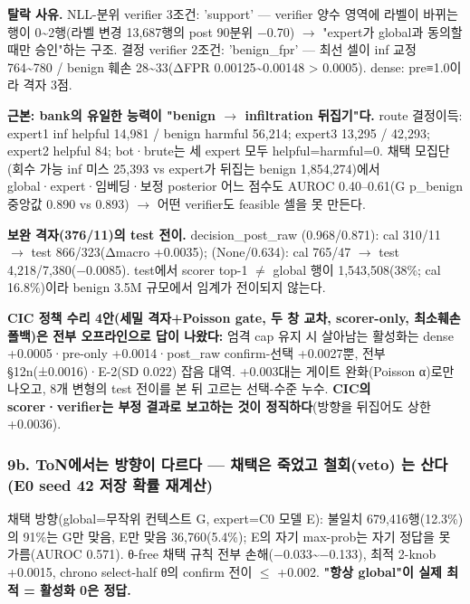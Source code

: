 \par\noindent \textbullet\enspace \textbf{탈락 사유.} NLL-분위 verifier 3조건: 'support' — verifier 양수 영역에 라벨이 바뀌는 행이 0\textasciitilde{}2행(라벨 변경 13,687행의 post 90분위 −0.70)  \ensuremath{\rightarrow}  "expert가 global과 동의할 때만 승인"하는 구조. 결정 verifier 2조건: 'benign\_\allowbreak{}fpr' — 최선 셀이 inf 교정 764\textasciitilde{}780 /\allowbreak{} benign 훼손 28\textasciitilde{}33(ΔFPR 0.00125\textasciitilde{}0.00148 > 0.0005). dense: pre≡1.0이라 격자 3점.


\par\noindent \textbullet\enspace \textbf{근본: bank의 유일한 능력이 "benign \ensuremath{\rightarrow} infiltration 뒤집기"다.} route 결정이득: expert1 inf helpful 14,981 /\allowbreak{} benign harmful 56,214; expert3 13,295 /\allowbreak{} 42,293; expert2 helpful 84; bot·brute는 세 expert 모두 helpful=\allowbreak{}harmful=\allowbreak{}0. 채택 모집단(회수 가능 inf 미스 25,393 vs expert가 뒤집는 benign 1,854,274)에서 global·expert·임베딩·보정 posterior 어느 점수도 AUROC 0.40–0.61(G p\_\allowbreak{}benign 중앙값 0.890 vs 0.893)  \ensuremath{\rightarrow}  어떤 verifier도 feasible 셀을 못 만든다.


\par\noindent \textbullet\enspace \textbf{보완 격자(376/\allowbreak{}11)의 test 전이.} decision\_\allowbreak{}post\_\allowbreak{}raw (0.968/\allowbreak{}0.871): cal 310/\allowbreak{}11  \ensuremath{\rightarrow}  test 866/\allowbreak{}323(Δmacro +\allowbreak{}0.0035); (None/\allowbreak{}0.634): cal 765/\allowbreak{}47  \ensuremath{\rightarrow}  test 4,218/\allowbreak{}7,380(−0.0085). test에서 scorer top-1 \ensuremath{\neq} global 행이 1,543,508(38\%; cal 16.8\%)이라 benign 3.5M 규모에서 임계가 전이되지 않는다.


\par\noindent \textbullet\enspace \textbf{CIC 정책 수리 4안(세밀 격자+\allowbreak{}Poisson gate, 두 창 교차, scorer-only, 최소훼손 폴백)은 전부 오프라인으로 답이 나왔다:} 엄격 cap 유지 시 살아남는 활성화는 dense +\allowbreak{}0.0005·pre-only +\allowbreak{}0.0014·post\_\allowbreak{}raw confirm-선택 +\allowbreak{}0.0027뿐, 전부 §12n(±0.0016)·E-2(SD 0.022) 잡음 대역. +\allowbreak{}0.003대는 게이트 완화(Poisson α)로만 나오고, 8개 변형의 test 전이를 본 뒤 고르는 선택-수준 누수. \textbf{CIC의 scorer·verifier는 부정 결과로 보고하는 것이 정직하다}(방향을 뒤집어도 상한 +\allowbreak{}0.0036).


\subsubsection{9b. ToN에서는 방향이 다르다 — 채택은 죽었고 \textbf{철회(veto)} 는 산다 (E0 seed 42 저장 확률 재계산)}
\par\noindent \textbullet\enspace 채택 방향(global=\allowbreak{}무작위 컨텍스트 G, expert=\allowbreak{}C0 모델 E): 불일치 679,416행(12.3\%)의 91\%는 G만 맞음, E만 맞음 36,760(5.4\%); E의 자기 max-prob는 자기 정답을 못 가름(AUROC 0.571). θ-free 채택 규칙 전부 손해(−0.033\textasciitilde{}−0.133), 최적 2-knob +\allowbreak{}0.0015, chrono select-half θ의 confirm 전이 \ensuremath{\leq} +\allowbreak{}0.002. \textbf{"항상 global"이 실제 최적 =\allowbreak{} 활성화 0은 정답.}


